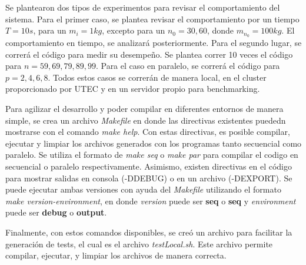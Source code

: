 Se plantearon dos tipos de experimentos para revisar el comportamiento del sistema. Para el primer caso, se plantea revisar el comportamiento por un tiempo $T = 10s$, para un $m_i = 1 kg$, excepto para un $n_0 = 30, 60$, donde $m_{n_0} = 100 kg$. El comportamiento en tiempo, se analizará posteriormente. Para el segundo lugar, se correrá el código para medir su desempeño. Se plantea correr 10 veces el código para $n={59,69,79,89,99}$. Para el caso en paralelo, se correrá el código para $p={2,4,6,8}$. Todos estos casos se correrán de manera local, en el cluster proporcionado por UTEC y en un servidor propio para benchmarking.

Para agilizar el desarrollo y poder compilar en diferentes entornos de manera simple, se crea un archivo \textit{Makefile} en donde las directivas existentes puededn mostrarse con el comando \textit{make help}. Con estas directivas, es posible compilar, ejecutar y limpiar los archivos generados con los programas tanto secuencial como paralelo. Se utiliza el formato de \textit{make seq} o \textit{make par} para compilar el codigo en secuencial o paralelo respectivamente. Asimismo, existen directivas en el código para mostrar salidas en consola (-DDEBUG) o en un archivo (-DEXPORT). Se puede ejecutar ambas versiones con ayuda del \textit{Makefile} utilizando el formato \textit{make version-environment}, en donde \textit{version} puede ser \textbf{seq} o \textbf{seq} y \textit{environment} puede ser \textbf{debug} o \textbf{output}. 

Finalmente, con estos comandos disponibles, se creó un archivo para facilitar la generación de tests, el cual es el archivo \textit{testLocal.sh}. Este archivo permite compilar, ejecutar, y limpiar los archivos de manera correcta.